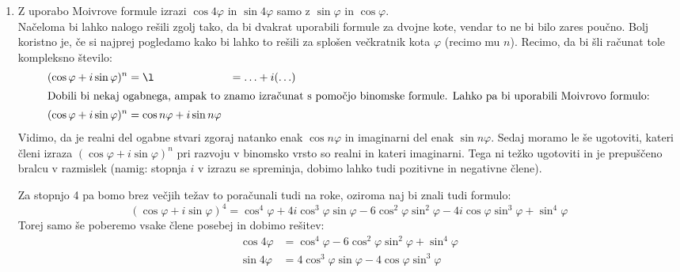 \documentclass[12pt,a4paper,slovene]{article}
\begin{document}
\begin{enumerate}[(1)]
    
    \item Z uporabo Moivrove formule izrazi $\cos 4\varphi$ in $\sin 4\varphi$ samo z $\sin \varphi$ in $\cos \varphi$.\\
    Načeloma bi lahko nalogo rešili zgolj tako, da bi dvakrat uporabili formule za dvojne kote, vendar to ne bi bilo zares poučno. Bolj koristno je, če si najprej pogledamo kako bi lahko to rešili za splošen večkratnik kota $\varphi$ (recimo mu $n$).
    Recimo, da bi šli računat tole kompleksno število:
    \begin{align*}
        (\cos \varphi + i \sin \varphi)^n &= \l &= \ldots  + i(\ldots)\\
        \intertext{Dobili bi nekaj ogabnega, ampak to znamo izračunat s pomočjo binomske formule. Lahko pa bi uporabili Moivrovo formulo:}
        (\cos \varphi + i \sin \varphi)^n &= \cos n\varphi + i \sin n \varphi
    \end{align*}
    Vidimo, da je realni del ogabne stvari zgoraj natanko enak $\cos n \varphi$ in imaginarni del enak $\sin n \varphi$. Sedaj moramo le še ugotoviti, kateri členi izraza $(\cos \varphi + i \sin \varphi)^n$ pri razvoju v binomsko vrsto so realni in kateri imaginarni. Tega ni težko ugotoviti in je prepuščeno bralcu v razmislek (namig: stopnja $i$ v izrazu se spreminja, dobimo lahko tudi pozitivne in negativne člene).
    
    Za stopnjo 4 pa bomo brez večjih težav to poračunali tudi na roke, oziroma naj bi znali tudi formulo:
    \[
    (\cos \varphi + i \sin \varphi)^4 = \cos^4 \varphi + 4i \cos^3 \varphi \sin \varphi - 6 \cos^2 \varphi \sin^2 \varphi - 4i \cos \varphi \sin^3 \varphi + \sin^4 \varphi
    \]
    Torej samo še poberemo vsake člene posebej in dobimo rešitev:
    \begin{align*}
    \cos 4 \varphi &= \cos^4 \varphi - 6 \cos^2 \varphi \sin^2 \varphi + \sin^4 \varphi\\
    \sin 4 \varphi &= 4\cos^3 \varphi \sin \varphi - 4 \cos \varphi \sin^3 \varphi
    \end{align*}

     
\end{enumerate}
\end{document}
